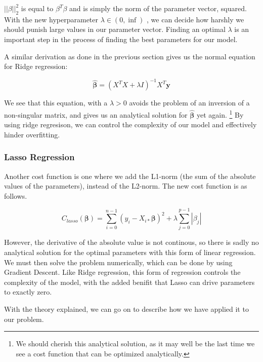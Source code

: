 \documentclass[twocolumn,10pt,cleanfoot]{asme2ej}
\begin{document}
	$||\beta||_2^2$ is equal to $\beta^T\beta$ and is simply the norm of the parameter vector, squared. With the new hyperparameter $\lambda \in (0, \inf)$ , we can decide how harshly we should punish large values in our parameter vector. Finding an optimal $\lambda$ is an important step in the process of finding the best parameters for our model.

A similar derivation as done in the previous section gives us the normal equation for Ridge regression:

\begin{equation}
	\bm{\hat{\beta}} = (X^TX + \lambda I)^{-1}X^T\bm{y}
\end{equation}

	We see that this equation, with a $\lambda > 0$ avoids the problem of an inversion of a non-singular matrix, and gives us an analytical solution for $\bm{\hat{\beta}}$ yet again. \footnote{We should cherish this analytical solution, as it may well be the last time we see a cost function that can be optimized analytically.} By using ridge regresison, we can control the complexity of our model and effectively hinder overfitting.

\subsubsection{Lasso Regression}

	Another cost function is one where we add the L1-norm (the sum of the absolute values of the parameters), instead of the L2-norm. The new cost function is as follows.

\begin{equation}
	C_{lasso}(\bm{\beta}) = \sum_{i=0}^{n-1}(y_i-X_{i*}\bm{\beta})^2 + \lambda \sum_{j=0}^{p-1} |\beta_j|
\end{equation}

However, the derivative of the absolute value is not continous, so there is sadly no analytical solution for the optimal parameters with this form of linear regression. We must then solve the problem numerically, which can be done by using Gradient Descent. Like Ridge regression, this form of regression controls the complexity of the model, with the added benifit that Lasso can drive parameters to exactly zero.

With the theory explained, we can go on to describe how we have applied it to our problem.
\end{document}
